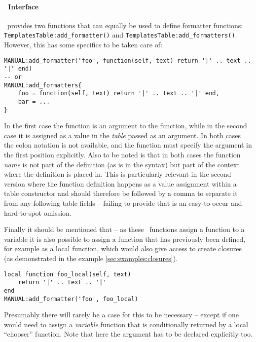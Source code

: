 \documentclass[12pt]{scrartcl}
\begin{document}
\paragraph{\luatemplates\ Interface}

\luatemplates\ provides two functions that can equally be used to define
formatter functions: \texttt{TemplatesTable:add_formatter()} and
\texttt{TemplatesTable:add_formatters()}.  However, this has some
specifics to be taken care of:

\begin{verbatim}
MANUAL:add_formatter('foo', function(self, text) return '|' .. text .. '|' end)
-- or
MANUAL:add_formatters{
	foo = function(self, text) return '|' .. text .. '|' end,
	bar = ...
}
\end{verbatim}

\noindent In the first case the function is an argument to the
 function, while in the second case it is assigned as a
value in the \emph{table} passed as an argument.  In both cases the colon
notation is not available, and the function must specify the 
argument in the first position explicitly.  Also to be noted is that in both
cases the function \emph{name} is not part of the definition (as is in the
 syntax) but part of the context where the definition is
placed in.  This is particularly relevant in the second version where the
function definition happens as a value assignment within a table constructor and
should therefore be followed by a comma to separate it from any following table
fields -- failing to provide that is an easy-to-occur and hard-to-spot omission.

Finally it should be mentioned that -- as these \luatemplates\ functions assign
a function to a variable it is also possible to assign a function that has
previously been defined, for example as a local function, which would also give
access to create closures (as demonstrated in the example
\vref{sec:examples:closures}).

\begin{verbatim}
local function foo_local(self, text)
    return '|' .. text .. '|'
end
MANUAL:add_formatter('foo', foo_local)
\end{verbatim}

\noindent Presumably there will rarely be a case for this to be necessary --
except if one would need to assign a \emph{variable} function that is
conditionally returned by a local “chooser” function.  Note that here the
 argument has to be declared explicitly too.
\end{document}
